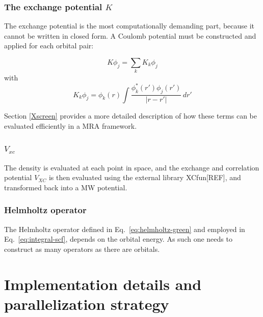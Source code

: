 \documentclass[%
 aip,
 amsmath,amssymb,
 reprint,%
]{revtex4-1}
\begin{document}
\subsubsection{The exchange potential $K$}

The exchange potential is the most computationally demanding part, because it cannot be written in closed form. A Coulomb potential must be constructed and applied for each orbital pair:

\begin{equation}
  K \phi_j = \sum_k  K_k \phi_j 
\end{equation}
with 
\begin{equation}
  K_k \phi_j = \phi_k(r) \int \frac{\phi^*_k(r')\phi_j(r')}{|r-r'|} \, dr'
\end{equation}

Section \ref{Xscreen} provides a more detailed description of how these terms can be evaluated efficiently in a MRA framework. 

\subsubsection{$V_{xc}$}
The density is evaluated at each point in space, and the exchange and correlation potential $V_{XC}$ is then evaluated using the external library XCfun[REF], and transformed back into a MW potential.

\subsubsection{Helmholtz operator}

The Helmholtz operator defined in Eq.~\ref{eq:helmholtz-green} and employed in Eq.~\ref{eq:integral-scf}, depends on the orbital energy. As such one needs to construct as many operators as there are orbitals.


\section{Implementation details and parallelization strategy}
\end{document}

